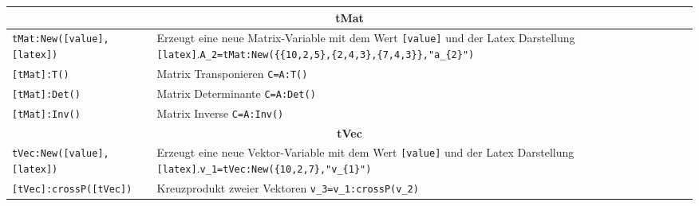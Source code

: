 \begin{table}[h]
	\begin{tabular}{|p{}|p{}|}
		\hline
		\multicolumn{2}{|c|}{\textbf{tMat}}\\
		\hline
		\lstinline{tMat:New([value],[latex])} & Erzeugt eine neue Matrix-Variable mit dem Wert \lstinline{[value]} und der Latex Darstellung \lstinline{[latex]}.\newline \lstinline!A_2=tMat:New({{10,2,5},{2,4,3},{7,4,3}},"a_{2}")!\\
		\hline
		\lstinline{[tMat]:T()} & Matrix Transponieren \newline \lstinline!C=A:T()!\\
		\hline
		\lstinline{[tMat]:Det()} & Matrix Determinante \newline \lstinline!C=A:Det()!\\
		\hline
		\lstinline{[tMat]:Inv()} & Matrix Inverse \newline \lstinline!C=A:Inv()!\\
		\hline
		\multicolumn{2}{|c|}{\textbf{tVec}}\\
		\hline
		\lstinline{tVec:New([value],[latex])} & Erzeugt eine neue Vektor-Variable mit dem Wert \lstinline{[value]} und der Latex Darstellung \lstinline{[latex]}.\newline \lstinline!v_1=tVec:New({10,2,7},"v_{1}")!\\
		\hline
		\lstinline{[tVec]:crossP([tVec])} & Kreuzprodukt zweier Vektoren \newline \lstinline!v_3=v_1:crossP(v_2)!\\
		\hline
	\end{tabular}
\end{table}
